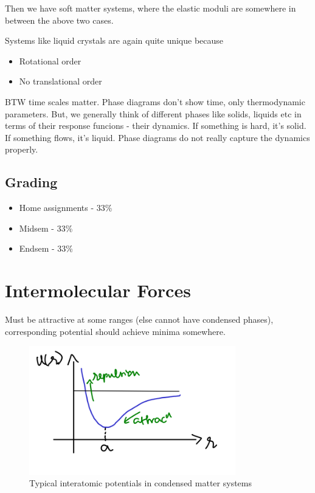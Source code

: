 \documentclass[a4paper]{article}
\begin{document}
Then  we have soft matter  systems, where the elastic moduli are
somewhere in between the above two  cases.

Systems like liquid crystals  are again quite unique because 
\begin{itemize}
	\item  Rotational order
	\item No translational order
\end{itemize}

BTW time scales matter. Phase diagrams don't  show time, only
thermodynamic parameters. But, we generally think of different phases
like solids, liquids etc in terms of their response funcions - their dynamics.
If something is hard, it's solid. If something flows, it's liquid.
Phase diagrams do not really capture the dynamics  properly.

\subsection{Grading}
\begin{itemize}
	\item Home assignments - 33\%
	\item Midsem - 33\%
	\item Endsem - 33\%
\end{itemize}

\section*{Intermolecular Forces}
Must be attractive at some ranges (else cannot have condensed phases), corresponding potential should achieve minima somewhere.
\begin{figure}[h]
	\centering
	\includegraphics[width=0.8\textwidth]{figures/attr.png}
	\caption{Typical interatomic potentials in condensed matter systems}
	\label{fig:figures-attr-png}
\end{figure}
\end{document}
